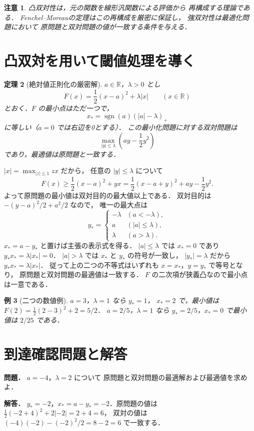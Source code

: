 \documentclass[a5paper,10pt,onecolumn]{jsarticle}
\makeatletter
\theoremstyle{mathnotetheorem}
\newtheorem{theorem}{定理}[section]
\newtheorem{example}[theorem]{例}
\newtheorem{remark}[theorem]{注意}
\renewcommand{\proofname}{証明}
\renewenvironment{proof}[1][\proofname]{%
  \par\pushQED{\qed}\normalfont\topsep4\p@\@plus2\p@\relax
  \trivlist\item[\hskip\labelsep\bfseries #1]\ignorespaces
}{\popQED\endtrivlist\@endpefalse}
\makeatother
\begin{document}
\begin{remark}
凸双対性は，元の関数を線形汎関数による評価から
再構成する理論である．
Fenchel--Moreauの定理はこの再構成を厳密に保証し，
強双対性は最適化問題において
原問題と双対問題の値が一致する条件を与える．
\end{remark}

\section{凸双対を用いて閾値処理を導く}
\begin{theorem}[絶対値正則化の厳密解]
$a\in\mathbb R$，$\lambda>0$ とし
\[
 F(x)=\frac12(x-a)^2+\lambda|x|
 \qquad(x\in\mathbb R)
\]
とおく．$F$ の最小点はただ一つで，
\[
 x_*=\operatorname{sgn}(a)(|a|-\lambda)_+
\]
に等しい（$a=0$ では右辺を0とする）．
この最小化問題に対する双対問題は
\[
 \max_{|y|\le\lambda}\left(ay-\frac12y^2\right)
\]
であり，最適値は原問題と一致する．
\end{theorem}
\begin{proof}
$|x|=\max_{|z|\le1}zx$ だから，
任意の $|y|\le\lambda$ について
\[
 F(x)\ge\frac12(x-a)^2+yx
       =\frac12(x-a+y)^2+ay-\frac12y^2.
\]
よって原問題の最小値は双対目的の最大値以上である．
双対目的は $-(y-a)^2/2+a^2/2$ なので，
唯一の最大点は
\[
 y_*=\begin{cases}
   -\lambda&(a<-\lambda),\\
   a&(|a|\le\lambda),\\
   \lambda&(a>\lambda).
 \end{cases}
\]
$x_*=a-y_*$ と置けば主張の表示式を得る．
$|a|\le\lambda$ では $x_*=0$ であり
$y_*x_*=\lambda|x_*|=0$．
$|a|>\lambda$ では $x_*$ と $y_*$ の符号が一致し，
$|y_*|=\lambda$ だから
$y_*x_*=\lambda|x_*|$．
従って上の二つの不等式はいずれも
$x=x_*$，$y=y_*$ で等号となり，
原問題と双対問題の最適値は一致する．
$F$ の二次項が狭義凸なので最小点は一意である．
\end{proof}
\begin{example}[二つの数値例]
$a=3$，$\lambda=1$ なら $y_*=1$，
$x_*=2$ で，最小値は
$F(2)=\frac12(2-3)^2+2=5/2$．
$a=2/5$，$\lambda=1$ なら
$y_*=2/5$，$x_*=0$ で最小値は $2/25$ である．
\end{example}
\section*{到達確認問題と解答}
\noindent\textbf{問題．}
$a=-4$，$\lambda=2$ について
原問題と双対問題の最適解および最適値を求めよ．

\medskip\noindent\textbf{解答．}
$y_*=-2$，$x_*=a-y_*=-2$．原問題の値は
$\frac12(-2+4)^2+2|-2|=2+4=6$，
双対の値は $(-4)(-2)-(-2)^2/2=8-2=6$ で一致する．
\end{document}
